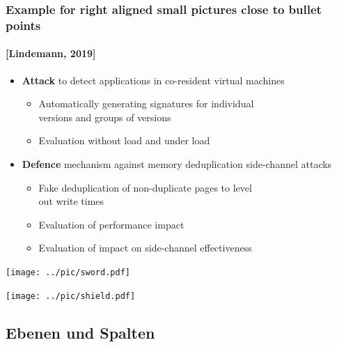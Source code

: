 \documentclass[t,aspectratio=169]{beamer}
\begin{document}
\begin{frame}
	\frametitle{Example for right aligned small pictures close to bullet points}
	\framesubtitle{[Lindemann, 2019]}
	\begin{itemize}
		\item \textbf{Attack} to detect applications in co-resident virtual machines 
		\begin{itemize}
			\item Automatically generating signatures for individual \\ versions and groups of versions
			\item Evaluation without load and under load
		\end{itemize}
		\item \medskip \textbf{Defence} mechanism against memory deduplication side-channel attacks
		\begin{itemize}
			\item Fake deduplication of non-duplicate pages to level \\ out write times
			\item Evaluation of performance impact
			\item Evaluation of impact on side-channel effectiveness
		\end{itemize}
	\end{itemize}
	\raggedleft %
	\par\vspace{-4.5cm} %
	\texttt{[image: ../pic/sword.pdf]} %
	\par\vspace{1.4cm} %
	\texttt{[image: ../pic/shield.pdf]} %
\end{frame}

\subsection{Ebenen und Spalten} %
\end{document}
